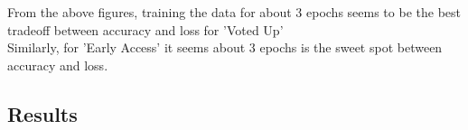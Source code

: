 \documentclass[11pt]{article} %
\begin{document}
\begin{figure}[h]
\centering
{}
\qquad
{}
\end{figure}
From the above figures,  training the data for about 3 epochs seems to be the best tradeoff between accuracy and loss for 'Voted Up'
\\ Similarly,  for 'Early Access' it seems about 3 epochs is the sweet spot between accuracy and loss.
\subsection{Results}
\end{document}
